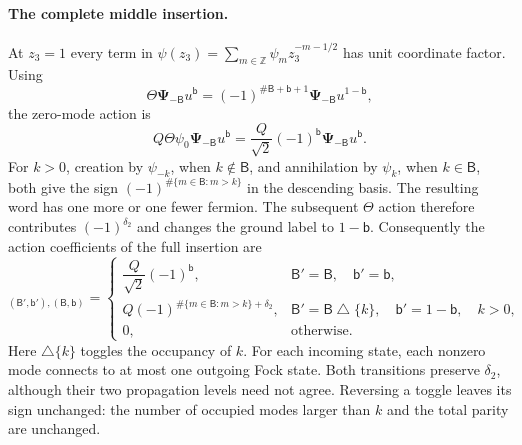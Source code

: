 \paragraph{The complete middle insertion.}
At $z_3=1$ every term in
$\psi(z_3)=\sum_{m\in\mathbb Z}\psi_mz_3^{-m-1/2}$ has unit
coordinate factor.  Using
\begin{equation}
 \Theta\boldsymbol\Psi_{-\mathsf B}u^{\mathsf b}
 =(-1)^{\#\mathsf B+\mathsf b+1}
  \boldsymbol\Psi_{-\mathsf B}u^{1-\mathsf b},
\end{equation}
the zero-mode action is
\begin{equation}
 Q\Theta\psi_0\boldsymbol\Psi_{-\mathsf B}u^{\mathsf b}
 =\frac Q{\sqrt2}(-1)^{\mathsf b}
  \boldsymbol\Psi_{-\mathsf B}u^{\mathsf b}.
\end{equation}
For $k>0$, creation by $\psi_{-k}$, when $k\notin\mathsf B$, and
annihilation by $\psi_k$, when $k\in\mathsf B$, both give the sign
$(-1)^{\#\{m\in\mathsf B:m>k\}}$ in the descending basis.
The resulting word has one more or one fewer fermion.  The subsequent
$\Theta$ action therefore contributes $(-1)^{\delta_2}$ and changes
the ground label to $1-\mathsf b$.  Consequently the action
coefficients of the full insertion are
\begin{equation}
 [Q\Theta\psi(1)]_{(\mathsf B',\mathsf b'),(\mathsf B,\mathsf b)}
 =\begin{cases}
  \dfrac Q{\sqrt2}(-1)^{\mathsf b},
       &\mathsf B'=\mathsf B,\quad\mathsf b'=\mathsf b,\\[3pt]
  Q(-1)^{\#\{m\in\mathsf B:m>k\}+\delta_2},
       &\mathsf B'=\mathsf B\mathbin\triangle\{k\},
          \quad\mathsf b'=1-\mathsf b,\quad k>0,\\[3pt]
  0,&\text{otherwise}.
 \end{cases}
 \label{direct-fermion-middle}
\end{equation}
Here $\triangle\{k\}$ toggles the occupancy of $k$.  For each incoming
state, each nonzero mode connects to at most one outgoing Fock state.
Both transitions
preserve $\delta_2$, although their two propagation levels need not
agree.  Reversing a toggle leaves its sign unchanged: the number of
occupied modes larger than $k$ and the total parity are unchanged.

